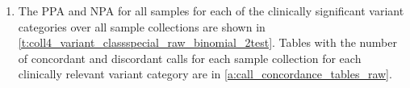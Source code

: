 \documentclass[12pt]{protocol}
\begin{document}
\begin{enumerate}
\begin{enumerate}
            \captionsetup{justification=justified,singlelinecheck=off,skip=0pt}
            \begin{table}[H]
            \centering
            \begin{threeparttable}
            \caption{\textbf{NPA for Sample Collection 1.}}
            \label{t:npa_combined4}
            
            \caption*{The 95\% Clopper-Pearson confidence intervals are 
            shown in the LLCI and ULCI columns.}
            \end{threeparttable}
            \end{table}
                    
        \item The PPA and NPA for all samples for each of the clinically significant 
              variant categories over all sample collections
              are shown in \cref{t:coll4_variant_classspecial_raw_binomial_2test}.
              Tables with the number of concordant and discordant calls for each sample
	          collection for each clinically relevant variant category
	          are in \cref{a:call_concordance_tables_raw}.
	   

\end{enumerate}
\end{enumerate}
\end{document}
